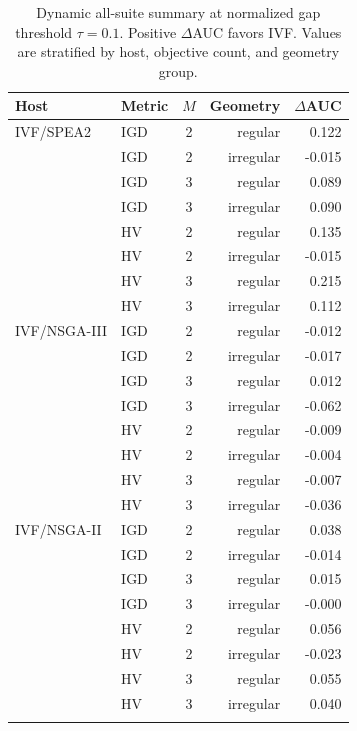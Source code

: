 \begin{table}[t]
\centering
\caption{Dynamic all-suite summary at normalized gap threshold $\tau=0.1$. Positive $\Delta$AUC favors IVF. Values are stratified by host, objective count, and geometry group.}
\label{tab:hosts_dynamic_tau10}
\scriptsize
\begin{tabular}{llcrr}
\toprule
Host & Metric & $M$ & Geometry & $\Delta$AUC \\
\midrule
IVF/SPEA2 & IGD & 2 & regular & 0.122 \\
 & IGD & 2 & irregular & -0.015 \\
 & IGD & 3 & regular & 0.089 \\
 & IGD & 3 & irregular & 0.090 \\
 & HV & 2 & regular & 0.135 \\
 & HV & 2 & irregular & -0.015 \\
 & HV & 3 & regular & 0.215 \\
 & HV & 3 & irregular & 0.112 \\
\addlinespace
IVF/NSGA-III & IGD & 2 & regular & -0.012 \\
 & IGD & 2 & irregular & -0.017 \\
 & IGD & 3 & regular & 0.012 \\
 & IGD & 3 & irregular & -0.062 \\
 & HV & 2 & regular & -0.009 \\
 & HV & 2 & irregular & -0.004 \\
 & HV & 3 & regular & -0.007 \\
 & HV & 3 & irregular & -0.036 \\
\addlinespace
IVF/NSGA-II & IGD & 2 & regular & 0.038 \\
 & IGD & 2 & irregular & -0.014 \\
 & IGD & 3 & regular & 0.015 \\
 & IGD & 3 & irregular & -0.000 \\
 & HV & 2 & regular & 0.056 \\
 & HV & 2 & irregular & -0.023 \\
 & HV & 3 & regular & 0.055 \\
 & HV & 3 & irregular & 0.040 \\
\addlinespace
\bottomrule
\end{tabular}
\end{table}
